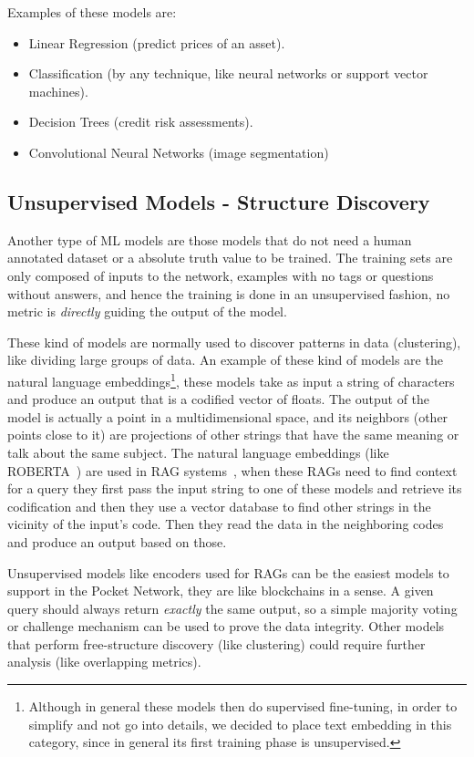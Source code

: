 Examples of these models are:
\begin{itemize}
    \item Linear Regression (predict prices of an asset).
    \item Classification (by any technique, like neural networks or support vector machines).
    \item Decision Trees (credit risk assessments).
    \item Convolutional Neural Networks (image segmentation)
\end{itemize}

\subsection{Unsupervised Models - Structure Discovery}

Another type of \gls{ML} models are those models that do not need a human annotated dataset or a absolute truth value to be trained. The training sets are only composed of inputs to the network, examples with no tags or questions without answers, and hence the training is done in an unsupervised fashion, no metric is \emph{directly} guiding the output of the model.

These kind of models are normally used to discover patterns in data (clustering), like dividing large groups of data. An example of these kind of models are the natural language embeddings\footnote{Although in general these models then do supervised fine-tuning, in order to simplify and not go into details, we decided to place text embedding in this category, since in general its first training phase is unsupervised.}, these models take as input a string of characters and produce an output that is a codified vector of floats. The output of the model is actually a point in a multidimensional space, and its neighbors (other points close to it) are projections of other strings that have the same meaning or talk about the same subject. 
The natural language embeddings (like ROBERTA~\cite{liu2019roberta}) are used in \gls{RAG} systems~\cite{li2022survey}, when these \glspl{RAG} need to find context for a query they first pass the input string to one of these models and retrieve its codification and then they use a vector database to find other strings in the vicinity of the input's code. Then they read the data in the neighboring codes and produce an output based on those.

Unsupervised models like encoders used for \glspl{RAG} can be the easiest models to support in the Pocket Network, they are like blockchains in a sense. A given query should always return \emph{exactly} the same output, so a simple majority voting or challenge mechanism can be used to prove the data integrity. Other models that perform free-structure discovery (like clustering) could require further analysis (like overlapping metrics).


